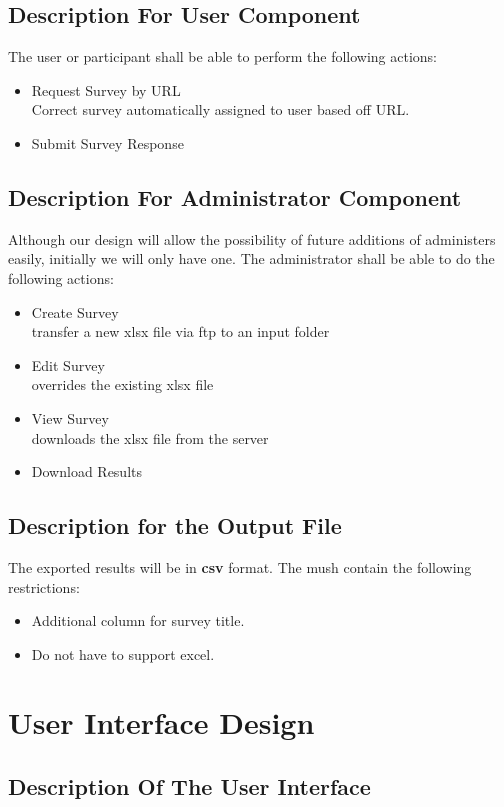 \documentclass[a4paper,12pt,oneside]{report}
\begin{document}
\section{ Description For User Component}

The user or participant shall be able to perform the following actions:
\begin{itemize}
	\item Request Survey by URL \\ Correct survey automatically assigned to user based off URL.
	\item Submit Survey Response
\end{itemize}
\section{  Description For Administrator Component}

Although our design will allow the possibility of future additions of administers easily, initially we will only have one. The administrator shall be able to do the following actions:
\begin{itemize}
	\item Create Survey \\ transfer a new xlsx file via ftp to an input folder
	\item Edit Survey \\ overrides the existing xlsx file
	\item View Survey \\ downloads the xlsx file from the server
	\item Download Results 
\end{itemize}

\section{Description for the Output File}
The exported results will be in {\bf csv} format. The mush contain the following restrictions:
\begin {itemize}
\item Additional column for survey title.
 \item Do not have to support excel.
\end{itemize}


\chapter{ User Interface Design}

\section{  Description Of The User Interface}
\end{document}
